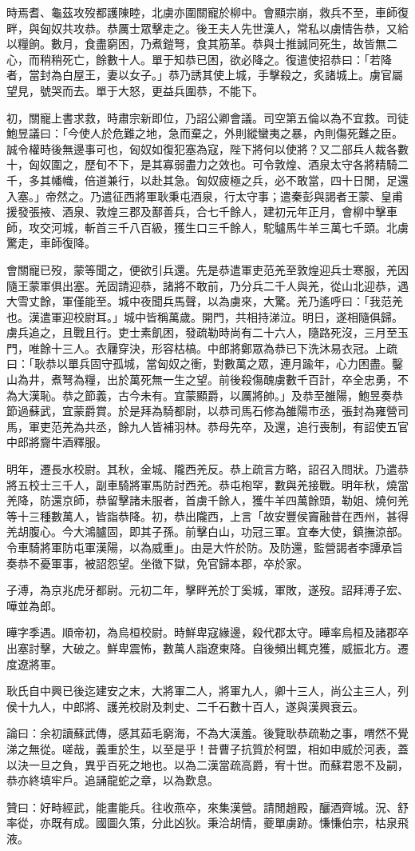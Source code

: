\begin{pinyinscope}
時焉耆、龜茲攻歿都護陳睦，北虜亦圍關寵於柳中。會顯宗崩，救兵不至，車師復畔，與匈奴共攻恭。恭厲士眾擊走之。後王夫人先世漢人，常私以虜情告恭，又給以糧餉。數月，食盡窮困，乃煮鎧弩，食其筋革。恭與士推誠同死生，故皆無二心，而稍稍死亡，餘數十人。單于知恭已困，欲必降之。復遣使招恭曰：「若降者，當封為白屋王，妻以女子。」恭乃誘其使上城，手擊殺之，炙諸城上。虜官屬望見，號哭而去。單于大怒，更益兵圍恭，不能下。

初，關寵上書求救，時肅宗新即位，乃詔公卿會議。司空第五倫以為不宜救。司徒鮑昱議曰：「今使人於危難之地，急而棄之，外則縱蠻夷之暴，內則傷死難之臣。誠令權時後無邊事可也，匈奴如復犯塞為寇，陛下將何以使將？又二部兵人裁各數十，匈奴圍之，歷旬不下，是其寡弱盡力之效也。可令敦煌、酒泉太守各將精騎二千，多其幡幟，倍道兼行，以赴其急。匈奴疲極之兵，必不敢當，四十日閒，足還入塞。」帝然之。乃遣征西將軍耿秉屯酒泉，行太守事；遣秦彭與謁者王蒙、皇甫援發張掖、酒泉、敦煌三郡及鄯善兵，合七千餘人，建初元年正月，會柳中擊車師，攻交河城，斬首三千八百級，獲生口三千餘人，駝驢馬牛羊三萬七千頭。北虜驚走，車師復降。

會關寵已歿，蒙等聞之，便欲引兵還。先是恭遣軍吏范羌至敦煌迎兵士寒服，羌因隨王蒙軍俱出塞。羌固請迎恭，諸將不敢前，乃分兵二千人與羌，從山北迎恭，遇大雪丈餘，軍僅能至。城中夜聞兵馬聲，以為虜來，大驚。羌乃遙呼曰：「我范羌也。漢遣軍迎校尉耳。」城中皆稱萬歲。開門，共相持涕泣。明日，遂相隨俱歸。虜兵追之，且戰且行。吏士素飢困，發疏勒時尚有二十六人，隨路死沒，三月至玉門，唯餘十三人。衣屨穿決，形容枯槁。中郎將鄭眾為恭已下洗沐易衣冠。上疏曰：「耿恭以單兵固守孤城，當匈奴之衝，對數萬之眾，連月踰年，心力困盡。鑿山為井，煮弩為糧，出於萬死無一生之望。前後殺傷醜虜數千百計，卒全忠勇，不為大漢恥。恭之節義，古今未有。宜蒙顯爵，以厲將帥。」及恭至雒陽，鮑昱奏恭節過蘇武，宜蒙爵賞。於是拜為騎都尉，以恭司馬石修為雒陽市丞，張封為雍營司馬，軍吏范羌為共丞，餘九人皆補羽林。恭母先卒，及還，追行喪制，有詔使五官中郎將齎牛酒釋服。

明年，遷長水校尉。其秋，金城、隴西羌反。恭上疏言方略，詔召入問狀。乃遣恭將五校士三千人，副車騎將軍馬防討西羌。恭屯枹罕，數與羌接戰。明年秋，燒當羌降，防還京師，恭留擊諸未服者，首虜千餘人，獲牛羊四萬餘頭，勒姐、燒何羌等十三種數萬人，皆詣恭降。初，恭出隴西，上言「故安豐侯竇融昔在西州，甚得羌胡腹心。今大鴻臚固，即其子孫。前擊白山，功冠三軍。宜奉大使，鎮撫涼部。令車騎將軍防屯軍漢陽，以為威重」。由是大忤於防。及防還，監營謁者李譚承旨奏恭不憂軍事，被詔怨望。坐徵下獄，免官歸本郡，卒於家。

子溥，為京兆虎牙都尉。元初二年，擊畔羌於丁奚城，軍敗，遂歿。詔拜溥子宏、嘩並為郎。

曄字季遇。順帝初，為烏桓校尉。時鮮卑寇緣邊，殺代郡太守。曄率烏桓及諸郡卒出塞討擊，大破之。鮮卑震怖，數萬人詣遼東降。自後頻出輒克獲，威振北方。遷度遼將軍。

耿氏自中興已後迄建安之末，大將軍二人，將軍九人，卿十三人，尚公主三人，列侯十九人，中郎將、護羌校尉及刺史、二千石數十百人，遂與漢興衰云。

論曰：余初讀蘇武傳，感其茹毛窮海，不為大漢羞。後覽耿恭疏勒之事，喟然不覺涕之無從。嗟哉，義重於生，以至是乎！昔曹子抗質於柯盟，相如申威於河表，蓋以決一旦之負，異乎百死之地也。以為二漢當疏高爵，宥十世。而蘇君恩不及嗣，恭亦終填牢戶。追誦龍蛇之章，以為歎息。

贊曰：好畤經武，能畫能兵。往收燕卒，來集漢營。請閒趙殿，釃酒齊城。況、舒率從，亦既有成。國圖久策，分此凶狄。秉洽胡情，夔單虜跡。慊慊伯宗，枯泉飛液。


\end{pinyinscope}